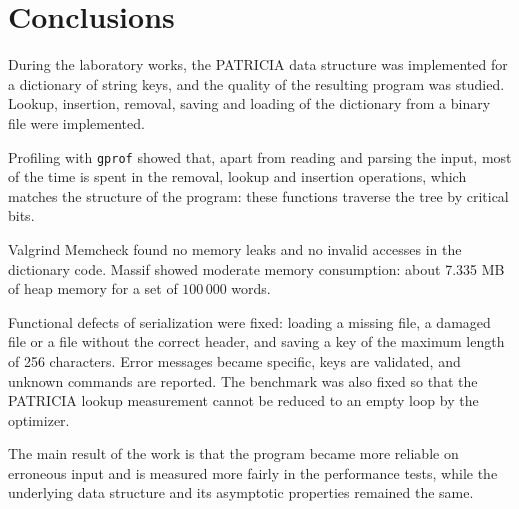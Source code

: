 \section{Conclusions}

During the laboratory works, the PATRICIA data structure was implemented for a dictionary of
string keys, and the quality of the resulting program was studied. Lookup, insertion, removal,
saving and loading of the dictionary from a binary file were implemented.

Profiling with \texttt{gprof} showed that, apart from reading and parsing the input, most of the
time is spent in the removal, lookup and insertion operations, which matches the structure of the
program: these functions traverse the tree by critical bits.

Valgrind Memcheck found no memory leaks and no invalid accesses in the dictionary code. Massif
showed moderate memory consumption: about 7.335 MB of heap memory for a set of $100\,000$ words.

Functional defects of serialization were fixed: loading a missing file, a damaged file or a file
without the correct header, and saving a key of the maximum length of 256 characters. Error
messages became specific, keys are validated, and unknown commands are reported. The benchmark was
also fixed so that the PATRICIA lookup measurement cannot be reduced to an empty loop by the
optimizer.

The main result of the work is that the program became more reliable on erroneous input and is
measured more fairly in the performance tests, while the underlying data structure and its
asymptotic properties remained the same.

\pagebreak
